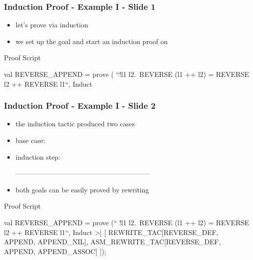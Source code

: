 \begin{frame}[fragile]
\frametitle{Induction Proof - Example I - Slide 1}

\begin{itemize}
\item let's prove via induction\\
\item we set up the goal and start an induction proof on 
\end{itemize}

\begin{block}{Proof Script}
\begin{semiverbatim}\small
val REVERSE_APPEND = prove (
``!l1 l2.\ REVERSE (l1 ++ l2) = REVERSE l2 ++ REVERSE l1``,
Induct
\end{semiverbatim}
\end{block}

\end{frame}

\begin{frame}[fragile]
\frametitle{Induction Proof - Example I - Slide 2}

\begin{itemize}
\item the induction tactic produced two cases
\item base case:\\
{\scriptsize{}}
\item induction step:\\
{\scriptsize
\begin{semiverbatim}
-----------------------------------------------------------
\end{semiverbatim}}

\item both goals can be easily proved by rewriting
\end{itemize}

\begin{block}{Proof Script}
\begin{semiverbatim}\scriptsize
val REVERSE_APPEND = prove (``
!l1 l2.\ REVERSE (l1 ++ l2) = REVERSE l2 ++ REVERSE l1``,
Induct >| [
  REWRITE_TAC[REVERSE_DEF, APPEND, APPEND_NIL],
  ASM_REWRITE_TAC[REVERSE_DEF, APPEND, APPEND_ASSOC]
]);
\end{semiverbatim}
\end{block}

\end{frame}


